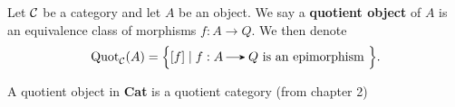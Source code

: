 \begin{definition}
    Let $\mathcal{C}$ be a category and let $A$ be an object. We say a \textbf{quotient object} of 
    $A$ is an equivalence class of morphisms $f: A \to Q$. We then denote 
    \[
        \text{Quot}_\cc(A) = \Big\{ [f] \mid f: A \to Q \text{ is an epimorphism }\Big\}.
    \]
\end{definition}


\begin{example}
    A quotient object in \textbf{Cat} is a quotient category (from chapter 2)
\end{example}




